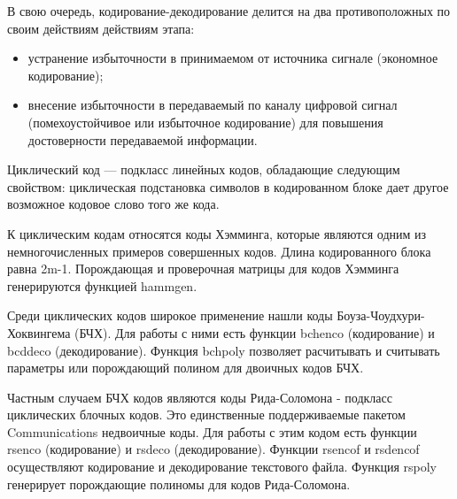 \documentclass[a4paper,12pt]{article}
\begin{document}
В свою очередь, кодирование-декодирование делится на два противоположных по своим действиям действиям этапа:
\begin{itemize}
\item устранение избыточности в принимаемом от источника сигнале (экономное кодирование);
\item внесение избыточности в передаваемый по каналу цифровой сигнал (помехоустойчивое или избыточное кодирование) для повышения достоверности передаваемой информации.
\end{itemize}

Циклический код — подкласс линейных кодов, обладающие следующим свойством: циклическая подстановка символов в кодированном блоке дает другое возможное кодовое слово того же кода.

К циклическим кодам относятся коды Хэмминга, которые являются одним из немногочисленных примеров совершенных кодов. Длина кодированного блока равна 2m-1. Порождающая и проверочная матрицы для кодов Хэмминга генерируются функцией hammgen. 

Среди циклических кодов широкое применение нашли коды Боуза-Чоудхури-Хоквингема (БЧХ). Для работы с ними есть функции bchenco (кодирование) и bcddeco (декодирование). Функция bchpoly позволяет расчитывать и считывать параметры или порождающий полином для двоичных кодов БЧХ.

Частным случаем БЧХ кодов являются коды Рида-Соломона - подкласс циклических блочных кодов. Это единственные поддерживаемые пакетом Communications недвоичные коды. Для работы с этим кодом есть функции rsenco (кодирование) и rsdeco (декодирование). Функции rsencof и rsdencof осуществляют кодирование и декодирование текстового файла. Функция rspoly генерирует порождающие полиномы для кодов Рида-Соломона.
\newpage
\end{document}
